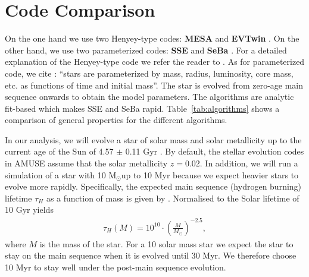 \documentclass{aa}
\newcommand{\Sun}[0]{\ensuremath{_{\odot}}}
\begin{document}
\section{Code Comparison}\label{sec:algorithms}
On the one hand we use two Henyey-type codes: \textbf{MESA} \citep{2011ApJS..192....3P, 2013ApJS..208....4P} and \textbf{EVTwin} \citep{1971MNRAS.151..351E, 1972MNRAS.156..361E, 1973MNRAS.163..279E, 1973A&A....23..325E, 1994MNRAS.270..121H, 1995MNRAS.274..964P, 2001ASPC..229..157E, 2001ApJ...552..664N, 2002ApJ...575..461E, 2007A&A...464L..57S, 2004MNRAS.348..201E, 2008A&A...488.1007G}. On the other hand, we use two parameterized codes:  \textbf{SSE} \citep{2000MNRAS.315..543H} and \textbf{SeBa} \citep{1996A&A...309..179P, 2012A&A...546A..70T}. For a detailed explanation of the Henyey-type code we refer the reader to \cite{1959ApJ...129..628H}. As for parameterized code, we cite \cite{AMUSEdocumentation}: ``stars are parameterized by mass, radius, luminosity, core mass, etc. as functions of time and initial mass''. The star is evolved from zero-age main sequence onwards to obtain the model parameters. The algorithms are analytic fit-based which makes SSE and SeBa rapid. Table~\ref{tab:algorithms} shows a comparison of general properties for the different algorithms.

In our analysis, we will evolve a star of solar mass and solar metallicity up to the current age of the Sun of 4.57 $\pm$ 0.11 Gyr \citep{2002A&A...390.1115B}. By default, the stellar evolution codes in AMUSE assume that the solar metallicity $z = 0.02$.
In addition, we will run a simulation of a star with 10 M\Sun up to 10 Myr because we expect heavier stars to evolve more rapidly. Specifically, the expected main sequence (hydrogen burning) lifetime $\tau_H$ as a function of mass is given by \citep[][p. 347]{2012sse..book.....K}. Normalised to the Solar lifetime of 10 Gyr \citep{1993ApJ...418..457S} yields
\begin{eqnarray}
     \tau_H(M) = 10^{10} \cdot \left(\frac{M}{M\Sun}\right)^{-2.5},
\end{eqnarray} where $M$ is the mass of the star. For a 10 solar mass star we expect the star to stay on the main sequence when it is evolved until 30 Myr. We therefore choose 10 Myr to stay well under the post-main sequence evolution.
\end{document}
